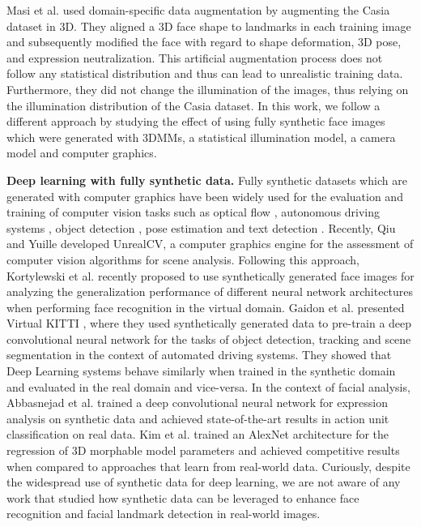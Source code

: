 \documentclass[10pt,twocolumn,letterpaper]{article}
\begin{document}
    Masi et al. \cite{masi2016we} used domain-specific data augmentation by augmenting the Casia dataset \cite{casia} in 3D. They aligned a 3D face shape to landmarks in each training image and subsequently modified the face with regard to shape deformation, 3D pose, and expression neutralization. This artificial augmentation process does not follow any statistical distribution and thus can lead to unrealistic training data. Furthermore, they did not change the illumination of the images, thus relying on the illumination distribution of the Casia dataset. In this work, we follow a different approach by studying the effect of using fully synthetic face images which were generated with 3DMMs, a statistical illumination model, a camera model and computer graphics.
    
    \textbf{Deep learning with fully synthetic data.} 
    Fully synthetic datasets which are generated with computer graphics have been widely used for the evaluation and training of computer vision tasks such as optical flow \cite{butler2012naturalistic}, autonomous driving systems \cite{chen2015deepdriving}, object detection \cite{gupta2014learning}, pose estimation \cite{shotton2011real,park2015articulated,ionescu2014human3} and text detection \cite{gupta2016synthetic}. Recently, Qiu and Yuille \cite{qiu2017unrealcv} developed UnrealCV, a computer graphics engine for the assessment of computer vision algorithms for scene analysis. Following this approach, Kortylewski et al. \cite{kortylewski2017empirically} recently proposed to use synthetically generated face images for analyzing the generalization performance of different neural network architectures when performing face recognition in the virtual domain. Gaidon et al. presented Virtual KITTI \cite{gaidon2016virtual}, where they used synthetically generated data to pre-train a deep convolutional neural network for the tasks of object detection, tracking and scene segmentation in the context of automated driving systems. They showed that Deep Learning systems behave similarly when trained in the synthetic domain and evaluated in the real domain and vice-versa. In the context of facial analysis, Abbasnejad et al. \cite{abbasnejad2017using} trained a deep convolutional neural network for expression analysis on synthetic data and achieved state-of-the-art results in action unit classification on real data. Kim et al. \cite{kim2017inversefacenet} trained an AlexNet architecture for the regression of 3D morphable model parameters and achieved competitive results when compared to approaches that learn from real-world data. Curiously, despite the widespread use of synthetic data for deep learning, we are not aware of any work that studied how synthetic data can be leveraged to enhance face recognition and facial landmark detection in real-world images.
\end{document}
